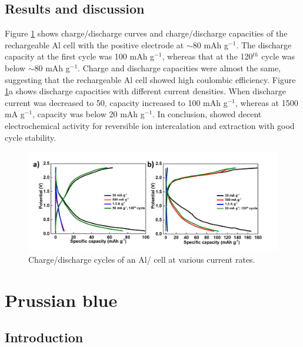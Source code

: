 \subsection{Results and discussion}
Figure \ref{Figures/chap6fig:C3N4cdc} shows charge/discharge curves and charge/discharge capacities of the rechargeable Al cell with the  positive electrode at $\sim$80 mAh g$^{-1}$. The discharge capacity at the first cycle was 100 mAh g$^{-1}$, whereas that at the 120$^{th}$ cycle was below $\sim$80 mAh g$^{-1}$. Charge and discharge capacities were almost the same, suggesting that the rechargeable Al cell showed high coulombic efficiency. Figure \ref{Figures/chap6fig:C3N4cdc}a shows discharge capacities with different current densities. When discharge current was decreased to 50, capacity increased to 100 mAh g$^{-1}$, whereas at 1500 mA g$^{-1}$, capacity was below 20 mAh g$^{-1}$. In conclusion,  showed decent electrochemical activity for reversible ion intercalation and extraction with good cycle stability. 

\begin{figure}[th!]
\centering
\includegraphics[width=\textwidth]{Figures/chap6fig/C3N4cdc}
\caption{Charge/discharge cycles of an Al/ cell at various current rates.}
\label{Figures/chap6fig:C3N4cdc}
\end{figure}

\section{Prussian blue}

\subsection{Introduction}

